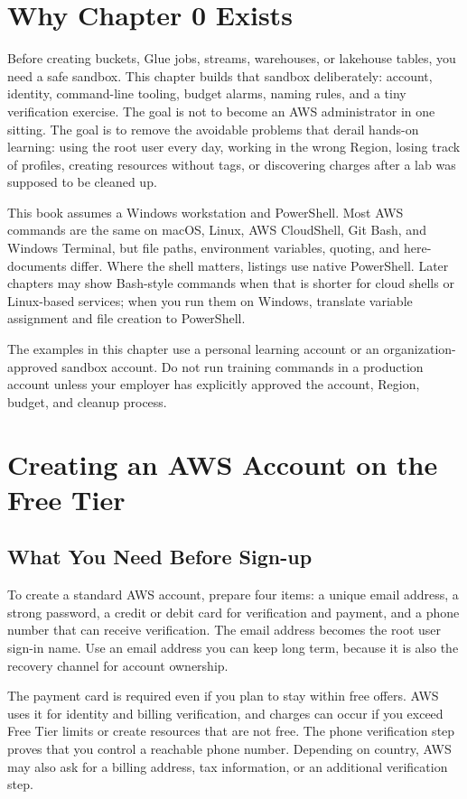\section{Why Chapter 0 Exists}
Before creating buckets, Glue jobs, streams, warehouses, or lakehouse tables, you need a safe sandbox. This chapter builds that sandbox deliberately: account, identity, command-line tooling, budget alarms, naming rules, and a tiny verification exercise. The goal is not to become an AWS administrator in one sitting. The goal is to remove the avoidable problems that derail hands-on learning: using the root user every day, working in the wrong Region, losing track of profiles, creating resources without tags, or discovering charges after a lab was supposed to be cleaned up.

This book assumes a Windows workstation and PowerShell. Most AWS commands are the same on macOS, Linux, AWS CloudShell, Git Bash, and Windows Terminal, but file paths, environment variables, quoting, and here-documents differ. Where the shell matters, listings use native PowerShell. Later chapters may show Bash-style commands when that is shorter for cloud shells or Linux-based services; when you run them on Windows, translate variable assignment and file creation to PowerShell.

\begin{notebox}
The examples in this chapter use a personal learning account or an organization-approved sandbox account. Do not run training commands in a production account unless your employer has explicitly approved the account, Region, budget, and cleanup process.
\end{notebox}

\section{Creating an AWS Account on the Free Tier}
\subsection{What You Need Before Sign-up}
To create a standard AWS account, prepare four items: a unique email address, a strong password, a credit or debit card for verification and payment, and a phone number that can receive verification. The email address becomes the root user sign-in name. Use an email address you can keep long term, because it is also the recovery channel for account ownership.

The payment card is required even if you plan to stay within free offers. AWS uses it for identity and billing verification, and charges can occur if you exceed Free Tier limits or create resources that are not free. The phone verification step proves that you control a reachable phone number. Depending on country, AWS may also ask for a billing address, tax information, or an additional verification step.

